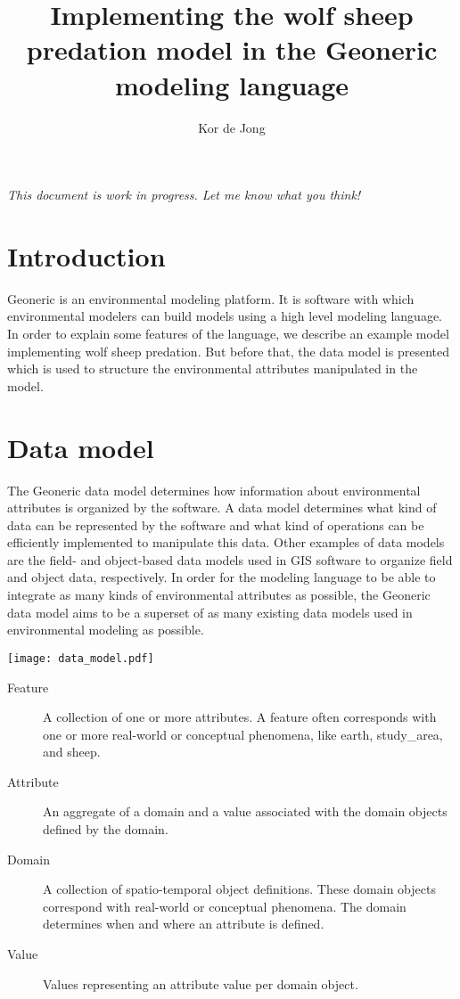 \documentclass[10pt, a4paper]{article}
\begin{document}
\title{Implementing the wolf sheep predation model in the Geoneric modeling language}
\author{Kor de Jong}
\maketitle

\emph{This document is work in progress. Let me know what you think!}

\section{Introduction}
Geoneric is an environmental modeling platform. It is software with which environmental modelers can build models using a high level modeling language. In order to explain some features of the language, we describe an example model implementing wolf sheep predation. But before that, the data model is presented which is used to structure the environmental attributes manipulated in the model.

\section{Data model}
The Geoneric data model determines how information about environmental attributes is organized by the software. A data model determines what kind of data can be represented by the software and what kind of operations can be efficiently implemented to manipulate this data. Other examples of data models are the field- and object-based data models used in GIS software to organize field and object data, respectively. In order for the modeling language to be able to integrate as many kinds of environmental attributes as possible, the Geoneric data model aims to be a superset of as many existing data models used in environmental modeling as possible.

\texttt{[image: data\_model.pdf]}

\begin{description}
    \item[Feature] A collection of one or more attributes. A feature often corresponds with one or more real-world or conceptual phenomena, like earth, study\_area, and sheep.
    \item[Attribute] An aggregate of a domain and a value associated with the domain objects defined by the domain.
    \item[Domain] A collection of spatio-temporal object definitions. These domain objects correspond with real-world or conceptual phenomena. The domain determines when and where an attribute is defined.
    \item[Value] Values representing an attribute value per domain object.
\end{description}
\end{document}
